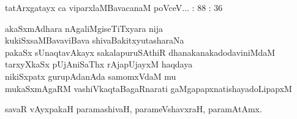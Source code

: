 \begin{entry}
\end{entry}

\begin{entry}
\gl{}
\info{}{}{}{}
\begin{shl}
tatArxgatayx ca viparxlaMBavacanaM poVceV... : 88 : 36
\end{shl}
\end{entry}

\begin{entry}
\gl{}
\begin{shl}
akaSxmAdhara nAgaliMgiseTiTxyara nija\\
kukiSxsaMBavaviBava shivaBakitxyutasharaNa\\
pakaSx sUnaqtavAkayx sakalapuruSAthiR dhanakanakadodaviniMdaM\\
tarxyXkaSx pUjAniSaThx rAjapUjayxM haqdaya\\
nikiSxpatx gurupAdanAda samomxVdaM mu\\
mukaSxmAgaRM vashiVkaqtaBagaRnarati gaMgapapxnatishayadoLipapxM
\end{shl}
\end{entry}

\begin{entry}
\gl{}
\info{}{}{}{}
\begin{shl}
savaR vAyxpakaH paramashivaH, parameVshavxraH, paramAtAmx.
\end{shl}
\end{entry}

